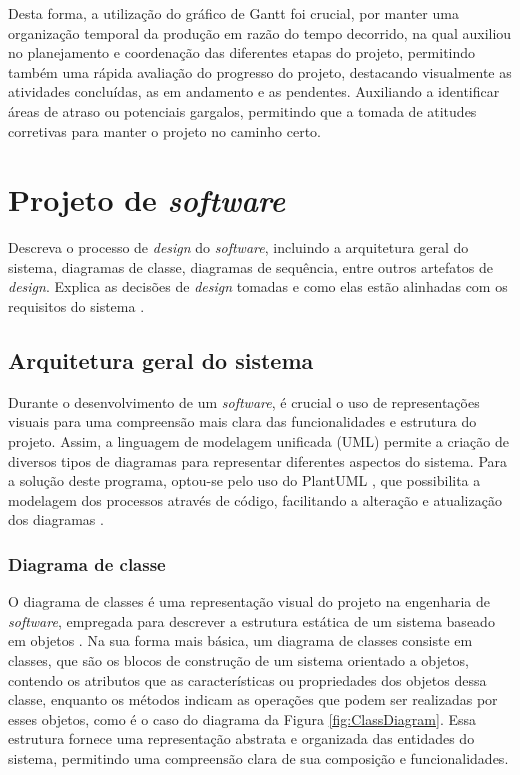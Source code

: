 Desta forma, a utilização do gráfico de Gantt foi crucial, por manter uma organização temporal da produção em razão do tempo decorrido, na qual auxiliou no planejamento e coordenação das diferentes etapas do projeto, permitindo também uma rápida avaliação do progresso do projeto, destacando visualmente as atividades concluídas, as em andamento e as pendentes. Auxiliando a identificar áreas de atraso ou potenciais gargalos, permitindo que a tomada de atitudes corretivas para manter o projeto no caminho certo.
        
\section{Projeto de \textit{software}}

Descreva o processo de \textit{design} do \textit{software}, incluindo a arquitetura geral do sistema, diagramas de classe, diagramas de sequência, entre outros artefatos de \textit{design}. Explica as decisões de \textit{design} tomadas e como elas estão alinhadas com os requisitos do sistema \cite{softwareeng}.

\subsection{Arquitetura geral do sistema}

Durante o desenvolvimento de um \textit{software}, é crucial o uso de representações visuais para uma compreensão mais clara das funcionalidades e estrutura do projeto. Assim, a linguagem de modelagem unificada (UML) permite a criação de diversos tipos de diagramas para representar diferentes aspectos do sistema. Para a solução deste programa, optou-se pelo uso do PlantUML \cite{plantumldoc}, que possibilita a modelagem dos processos através de código, facilitando a alteração e atualização dos diagramas \cite{softwareengreq}.

\subsubsection{Diagrama de classe}

O diagrama de classes é uma representação visual do projeto na engenharia de \textit{software}, empregada para descrever a estrutura estática de um sistema baseado em objetos \cite{softwareenguml}. Na sua forma mais básica, um diagrama de classes consiste em classes, que são os blocos de construção de um sistema orientado a objetos, contendo os atributos que as características ou propriedades dos objetos dessa classe, enquanto os métodos indicam as operações que podem ser realizadas por esses objetos, como é o caso do diagrama da Figura \ref{fig:ClassDiagram}. Essa estrutura fornece uma representação abstrata e organizada das entidades do sistema, permitindo uma compreensão clara de sua composição e funcionalidades.
            
